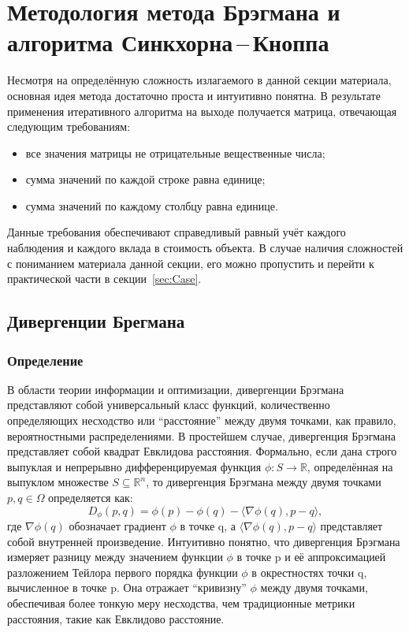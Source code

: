 \documentclass[12pt]{scrartcl}
\begin{document}
\section{Методология метода Брэгмана и алгоритма Синкхорна\,--\,Кноппа}\label{sec:Methodology}
Несмотря на определённую сложность излагаемого в данной секции материала, основная идея метода достаточно проста и интуитивно понятна. В результате применения итеративного алгоритма на выходе получается матрица, отвечающая следующим требованиям:
\begin{itemize}
    \item все значения матрицы не отрицательные вещественные числа;
    \item сумма значений по каждой строке равна единице;
    \item сумма значений по каждому столбцу равна единице.
\end{itemize}
Данные требования обеспечивают справедливый равный учёт каждого наблюдения и каждого вклада в стоимость объекта. В случае наличия сложностей с пониманием материала данной секции, его можно пропустить и перейти к практической части в секции~\ref{sec:Case}.

\subsection{Дивергенции Брегмана}\label{subsec:Divergentions}
\subsubsection{Определение}\label{subsubsec:Definition}
В области теории информации и оптимизации, дивергенции Брэгмана представляют собой универсальный класс функций, количественно определяющих несходство или ``расстояние'' между двумя точками, как правило, вероятностными распределениями. В простейшем случае, дивергенция Брэгмана представляет собой квадрат Евклидова расстояния. Формально, если дана строго выпуклая и непрерывно дифференцируемая функция $\phi: S \rightarrow \mathbb{R} $, определённая на выпуклом множестве $S \subseteq \mathbb{R}^n$, то дивергенция Брэгмана между двумя точками $p, q \in \Omega$ определяется как:
\begin{equation}
    D_{\phi}(p, q) = \phi(p) - \phi(q) - \langle \nabla \phi(q), p - q \rangle,
\end{equation}
где $\nabla \phi(q)$ обозначает градиент $\phi$ в точке q, а $\langle \nabla \phi(q), p - q \rangle$ представляет собой внутренней произведение. Интуитивно понятно, что дивергенция Брэгмана измеряет разницу между значением функции $\phi$ в точке p и её аппроксимацией разложением Тейлора первого порядка функции $\phi$ в окрестностях точки q, вычисленное в точке p. Она отражает ``кривизну'' $\phi$ между двумя точками, обеспечивая более тонкую меру несходства, чем традиционные метрики расстояния, такие как Евклидово расстояние.
\end{document}
